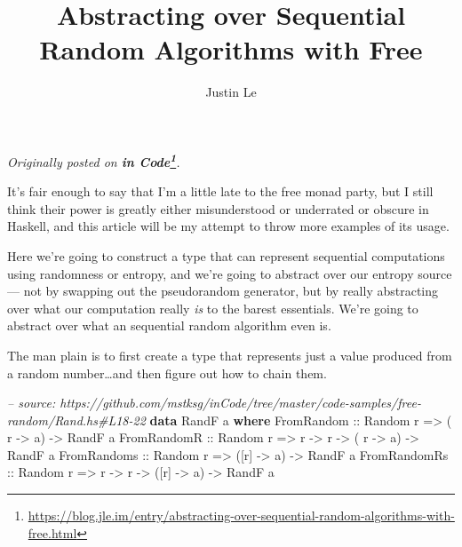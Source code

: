\documentclass[]{article}
\title{Abstracting over Sequential Random Algorithms with Free}
\author{Justin Le}
\newenvironment{Shaded}{}{}
\newcommand{\KeywordTok}[1]{\textcolor[rgb]{0.00,0.44,0.13}{\textbf{{#1}}}}
\newcommand{\DataTypeTok}[1]{\textcolor[rgb]{0.56,0.13,0.00}{{#1}}}
\newcommand{\CommentTok}[1]{\textcolor[rgb]{0.38,0.63,0.69}{\textit{{#1}}}}
\newcommand{\OtherTok}[1]{\textcolor[rgb]{0.00,0.44,0.13}{{#1}}}
\newcommand{\NormalTok}[1]{{#1}}
\renewcommand{\href}[2]{#2\footnote{\url{#1}}}
\begin{document}
\maketitle

\emph{Originally posted on
\textbf{\href{https://blog.jle.im/entry/abstracting-over-sequential-random-algorithms-with-free.html}{in
Code}}.}

It's fair enough to say that I'm a little late to the free monad party,
but I still think their power is greatly either misunderstood or
underrated or obscure in Haskell, and this article will be my attempt to
throw more examples of its usage.

Here we're going to construct a type that can represent sequential
computations using randomness or entropy, and we're going to abstract
over our entropy source --- not by swapping out the pseudorandom
generator, but by really abstracting over what our computation really
\emph{is} to the barest essentials. We're going to abstract over what an
sequential random algorithm even is.

The man plain is to first create a type that represents just a value
produced from a random number\ldots{}and then figure out how to chain
them.

\begin{Shaded}
\begin{Highlighting}[]
\CommentTok{-- source: https://github.com/mstksg/inCode/tree/master/code-samples/free-random/Rand.hs#L18-22}
\KeywordTok{data} \DataTypeTok{RandF} \NormalTok{a }\KeywordTok{where}
    \DataTypeTok{FromRandom}\OtherTok{   ::} \DataTypeTok{Random} \NormalTok{r }\OtherTok{=>}           \NormalTok{( r  }\OtherTok{->} \NormalTok{a) }\OtherTok{->} \DataTypeTok{RandF} \NormalTok{a}
    \DataTypeTok{FromRandomR}\OtherTok{  ::} \DataTypeTok{Random} \NormalTok{r }\OtherTok{=>} \NormalTok{r }\OtherTok{->} \NormalTok{r }\OtherTok{->} \NormalTok{( r  }\OtherTok{->} \NormalTok{a) }\OtherTok{->} \DataTypeTok{RandF} \NormalTok{a}
    \DataTypeTok{FromRandoms}\OtherTok{  ::} \DataTypeTok{Random} \NormalTok{r }\OtherTok{=>}           \NormalTok{([r] }\OtherTok{->} \NormalTok{a) }\OtherTok{->} \DataTypeTok{RandF} \NormalTok{a}
    \DataTypeTok{FromRandomRs}\OtherTok{ ::} \DataTypeTok{Random} \NormalTok{r }\OtherTok{=>} \NormalTok{r }\OtherTok{->} \NormalTok{r }\OtherTok{->} \NormalTok{([r] }\OtherTok{->} \NormalTok{a) }\OtherTok{->} \DataTypeTok{RandF} \NormalTok{a}
\end{Highlighting}
\end{Shaded}
\end{document}
